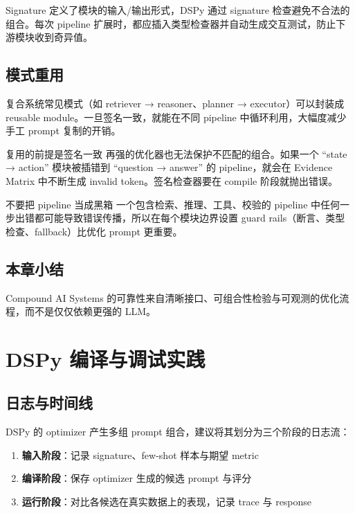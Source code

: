 \documentclass[a4paper]{article}
\begin{document}
Signature 定义了模块的输入/输出形式，DSPy 通过 signature 检查避免不合法的组合。每次 pipeline 扩展时，都应插入类型检查器并自动生成交互测试，防止下游模块收到奇异值。

\subsection{模式重用}

复合系统常见模式（如 retriever → reasoner、planner → executor）可以封装成 reusable module。一旦签名一致，就能在不同 pipeline 中循环利用，大幅度减少手工 prompt 复制的开销。

\begin{knowledgebox}{复用的前提是签名一致}
再强的优化器也无法保护不匹配的组合。如果一个 ``state → action'' 模块被插错到 ``question → answer'' 的 pipeline，就会在 Evidence Matrix 中不断生成 invalid token。签名检查器要在 compile 阶段就抛出错误。
\end{knowledgebox}

\begin{warningbox}{不要把 pipeline 当成黑箱}
一个包含检索、推理、工具、校验的 pipeline 中任何一步出错都可能导致错误传播，所以在每个模块边界设置 guard rails（断言、类型检查、fallback）比优化 prompt 更重要。
\end{warningbox}

\subsection{本章小结}

Compound AI Systems 的可靠性来自清晰接口、可组合性检验与可观测的优化流程，而不是仅仅依赖更强的 LLM。

\section{DSPy 编译与调试实践}

\subsection{日志与时间线}

DSPy 的 optimizer 产生多组 prompt 组合，建议将其划分为三个阶段的日志流：

\begin{enumerate}
    \item \textbf{输入阶段}：记录 signature、few-shot 样本与期望 metric
    \item \textbf{编译阶段}：保存 optimizer 生成的候选 prompt 与评分
    \item \textbf{运行阶段}：对比各候选在真实数据上的表现，记录 trace 与 response
\end{enumerate}
\end{document}
